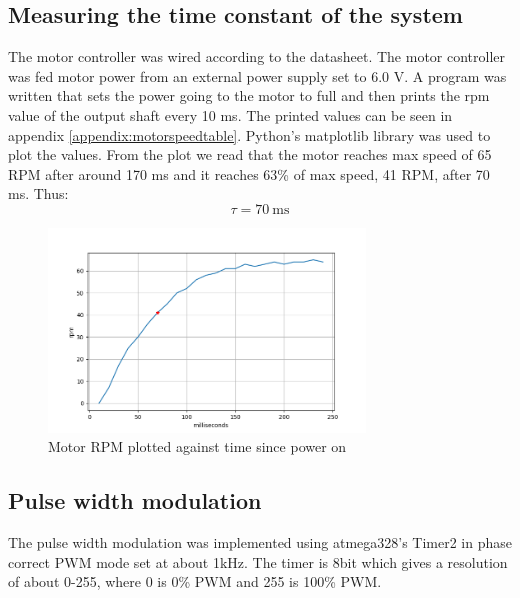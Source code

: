\documentclass{article}
\begin{document}
\subsection{Measuring the time constant of the system}
The motor controller was wired according to the datasheet. The motor controller was fed motor power from an external power supply set to 6.0 V.
A program was written that sets the power going to the motor to full and then prints the rpm value of the output shaft every 10 ms.
The printed values can be seen in appendix \ref{appendix:motorspeedtable}. Python's matplotlib library was used to plot the values. From the plot we read that the motor reaches max speed of 65 RPM after around 170 ms and it reaches 63\% of max speed, 41 RPM, after 70 ms. Thus:
\[\tau = 70 \SI{}{\milli\second}\]
\begin{figure}[h]
    \centering
    \includegraphics[width=0.75\textwidth]{Project2SpeedController/motor_response.png}
    \caption{Motor RPM plotted against time since power on}
    \label{fig:motor response}
\end{figure}
\subsection{Pulse width modulation}
The pulse width modulation was implemented using atmega328's Timer2 in phase correct PWM mode set at about 1kHz. The timer is 8bit which gives a resolution of about  0-255, where 0 is 0\% PWM and 255 is 100\% PWM. 

\maketitle
\end{document}

